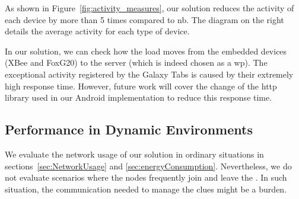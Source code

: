 As shown in Figure~\ref{fig:activity_measures}, our solution reduces the activity of each device by more than 5 times compared to \acl{nb}.
The diagram on the right details the average activity for each type of device.

In our solution, we can check how the load moves from the embedded devices (XBee and FoxG20) to the server (which is indeed chosen as a \ac{wp}).
The exceptional activity registered by the Galaxy Tabs is caused by their extremely high response time.
However, future work will cover the change of the \acs{http} library used in our Android implementation to reduce this response time.



%



\subsection{Performance in Dynamic Environments}
\label{sec:dynamic}
We evaluate the network usage of our solution in ordinary situations in sections~\ref{sec:NetworkUsage} and \ref{sec:energyConsumption}.
Nevertheless, we do not evaluate scenarios where the nodes frequently join and leave the \Space{}.
In such situation, the communication needed to manage the clues might be a burden.


